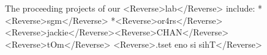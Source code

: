 The proceeding projects of our <Reverse>lab</Reverse> include:
   *<Reverse>sgm</Reverse>
   *<Reverse>or4rs</Reverse>
<Reverse>jackie</Reverse><Reverse>CHAN</Reverse>
<Reverse>tOm</Reverse>
<Reverse>.tset eno si sihT</Reverse>
